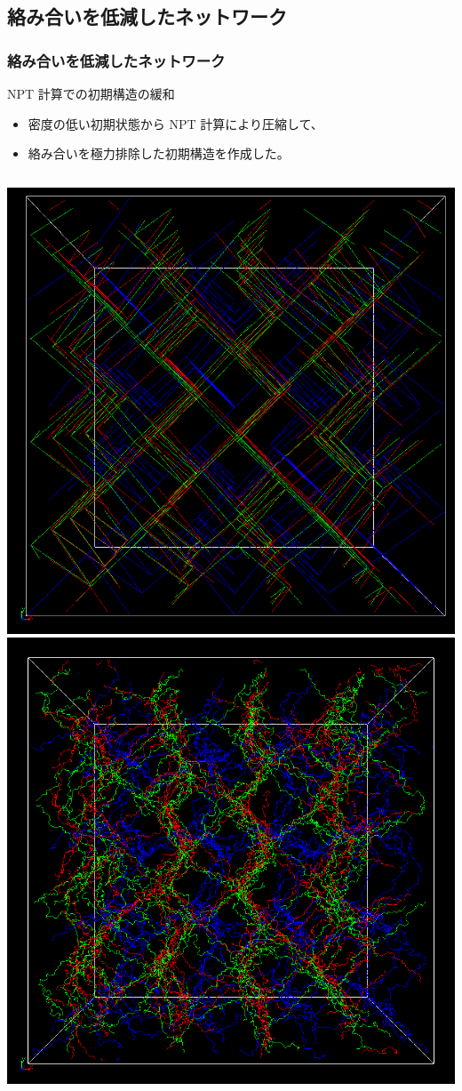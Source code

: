 \documentclass[12pt, dvipdfmx]{beamer}
\begin{document}
\subsection{絡み合いを低減したネットワーク}
\begin{frame}
	\frametitle{絡み合いを低減したネットワーク}
		\begin{exampleblock}{NPT 計算での初期構造の緩和}
			\begin{itemize}
				\item \alert{密度の低い初期状態}から NPT 計算により圧縮して、
				\item 絡み合いを極力排除した初期構造を作成した。
			\end{itemize}
		\end{exampleblock}

		\begin{columns}[T, onlytextwidth]
				\includegraphics[width=.9\textwidth]{NPT_00.png}
				\includegraphics[width=.9\textwidth]{NPT_11.png}
		\end{columns}
\end{frame}
\end{document}
